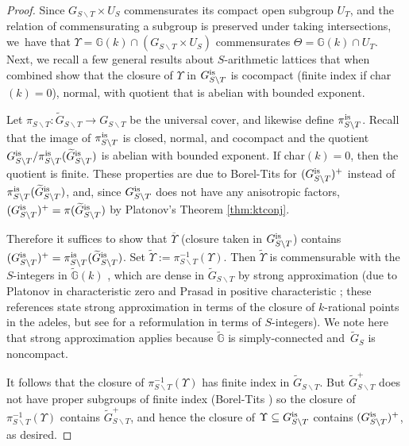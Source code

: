 \documentclass[JEP,XML,SOM,Unicode,published]{cedram}
\newcommand{\Y}{\ensuremath{\Upsilon}}
\let\bs\backslash
\newcommand{\bbG}{\ensuremath{\mathbb{G}}}
\theoremstyle{definition}
\begin{document}
\begin{proof} Since $G_{S\bs T}\times U_S$ commensurates its compact open subgroup $U_T$, and the relation of commensurating a subgroup is preserved under taking intersections, we~have that $\Y=\bbG(k)\cap (G_{S\bs T}\times U_S)$ commensurates $\Theta=\bbG(k)\cap U_T$. Next, we recall a few general results about $S$-arithmetic lattices that when combined show that the closure of $\Y$ in $G_{S\bs T}^{\textup{is}}$ is cocompact (finite index if char$(k)=0$), normal, with quotient that is abelian with bounded exponent.

Let $\pi_{S\bs T}:\widetilde{G}_{S\bs T}\to G_{S\bs T}$ be the universal cover, and likewise define $\pi_{S\bs T}^{\textup{is}}$. \hbox{Recall} that the image of $\pi_{S\bs T}^{\textup{is}}$ is closed, normal, and cocompact and the quotient $G_{S\bs T}^{\textup{is}}/\pi_{S\bs T}^{\textup{is}}(\widetilde{G}_{S\bs T}^{\textup{is}})$ is abelian with bounded exponent. If char$(k)=0$, then the quotient is finite. These properties are due to Borel-Tits \cite[3.19-20 \& 6.3]{borel-tits-morphismes-abstraits} for $(G_{S\bs T}^{\textup{is}})^+$ instead of $\pi_{S\bs T}^{\textup{is}}(\widetilde{G}_{S\bs T}^{\textup{is}})$, and, since $G_{S\bs T}^{\textup{is}}$ does not have any anisotropic factors, $(G_{S\bs T}^{\textup{is}})^+ = \pi(\widetilde{G}_{S\bs T}^{\textup{is}})$ by Platonov's Theorem \ref{thm:ktconj}.

Therefore it suffices to show that $\overline{\Y}$ (closure taken in $G_{S\bs T}^{\textup{is}}$) contains $(G_{S\bs T}^{\textup{is}})^+=\pi_{S\bs T}^{\textup{is}}(\widetilde{G}_{S\bs T}^{\textup{is}})$. Set $\widetilde{\Y}:=\pi_{S\bs T}^{-1}(\Y)$. Then $\widetilde{\Y}$ is commensurable with the $S$-integers in $\widetilde{\bbG}(k)$ \cite[I.3.2.9]{margulis-book}, which are dense in $\widetilde{G}_{S\bs T}$ by strong approximation (due to Platonov in characteristic zero \cite{platonov-strongapprox} and Prasad in positive characteristic \cite{prasad-strongapprox}; these references state strong approximation in terms of the closure of $k$-rational points in the adeles, but see \cite[Prop.\,7.2(2)]{platonov-rapinchuk-book} for a reformulation in terms of $S$-integers). We note here that strong approximation applies because $\widetilde{\bbG}$ is simply-connected and~$\widetilde{G}_S$ is noncompact.

It follows that the closure of $\pi_{S\bs T}^{-1}(\Y)$ has finite index in $\widetilde{G}_{S\bs T}$. But $\widetilde{G}_{S\bs T}^+$ does not have proper subgroups of finite index (Borel-Tits \cite[6.7]{borel-tits-morphismes-abstraits}) so the closure of $\pi_{S\bs T}^{-1}(\Y)$ contains $\widetilde{G}_{S\bs T}^+$, and hence the closure of $\Y\subseteq G_{S\bs T}^{\textup{is}}$ contains $(G_{S\bs T}^{\textup{is}})^+$, as desired.


\end{proof}
\end{document}
